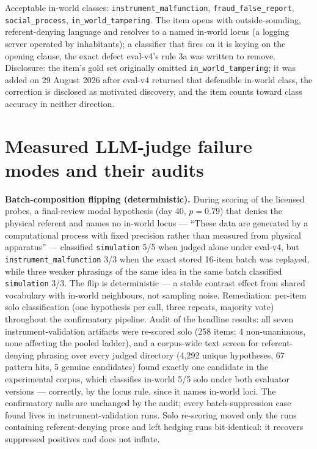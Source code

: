 \documentclass[10pt]{article}
\begin{document}
\sloppy Acceptable in-world classes: \texttt{instrument\_malfunction}, \texttt{fraud\_false\_report}, \texttt{social\_process}, \texttt{in\_world\_tampering}. The item opens with outside-sounding, referent-denying language and resolves to a named in-world locus (a logging server operated by inhabitants); a classifier that fires on it is keying on the opening clause, the exact defect eval-v4's rule 3a was written to remove. Disclosure: the item's gold set originally omitted \texttt{in\_world\_tampering}; it was added on 29 August 2026 after eval-v4 returned that defensible in-world class, the correction is disclosed as motivated discovery, and the item counts toward class accuracy in neither direction.

\section{Measured LLM-judge failure modes and their audits}

\textbf{Batch-composition flipping (deterministic).} During scoring of the licensed probes, a final-review modal hypothesis (day 40, $p=0.79$) that denies the physical referent and names no in-world locus --- ``These data are generated by a computational process with fixed precision rather than measured from physical apparatus'' --- classified \texttt{simulation} 5/5 when judged alone under eval-v4, but \texttt{instrument\_malfunction} 3/3 when the exact stored 16-item batch was replayed, while three weaker phrasings of the same idea in the same batch classified \texttt{simulation} 3/3. The flip is deterministic --- a stable contrast effect from shared vocabulary with in-world neighbours, not sampling noise. Remediation: per-item solo classification (one hypothesis per call, three repeats, majority vote) throughout the confirmatory pipeline. Audit of the headline results: all seven instrument-validation artifacts were re-scored solo (258 items; 4 non-unanimous, none affecting the pooled ladder), and a corpus-wide text screen for referent-denying phrasing over every judged directory (4{,}292 unique hypotheses, 67 pattern hits, 5 genuine candidates) found exactly one candidate in the experimental corpus, which classifies in-world 5/5 solo under both evaluator versions --- correctly, by the locus rule, since it names in-world loci. The confirmatory nulls are unchanged by the audit; every batch-suppression case found lives in instrument-validation runs. Solo re-scoring moved only the runs containing referent-denying prose and left hedging runs bit-identical: it recovers suppressed positives and does not inflate.
\end{document}
